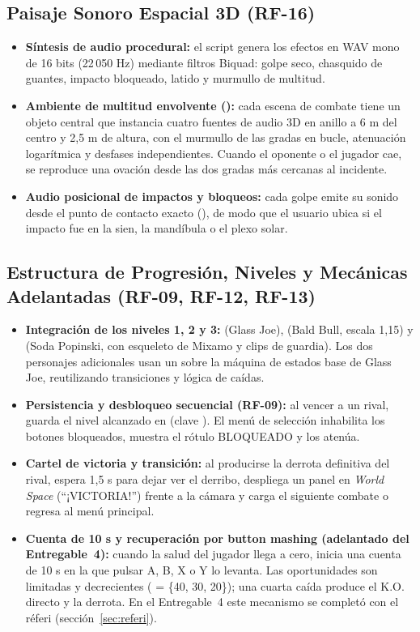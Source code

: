 \subsection{Paisaje Sonoro Espacial 3D (RF-16)}
\begin{itemize}
  \item \textbf{Síntesis de audio procedural:} el script  genera los efectos en WAV mono de 16 bits (22\,050 Hz) mediante filtros Biquad: golpe seco, chasquido de guantes, impacto bloqueado, latido y murmullo de multitud.
  \item \textbf{Ambiente de multitud envolvente ():} cada escena de combate tiene un objeto central que instancia cuatro fuentes de audio 3D en anillo a 6 m del centro y 2,5 m de altura, con el murmullo de las gradas en bucle, atenuación logarítmica y desfases independientes. Cuando el oponente o el jugador cae, se reproduce una ovación desde las dos gradas más cercanas al incidente.
  \item \textbf{Audio posicional de impactos y bloqueos:} cada golpe emite su sonido desde el punto de contacto exacto (), de modo que el usuario ubica si el impacto fue en la sien, la mandíbula o el plexo solar.
\end{itemize}

\subsection{Estructura de Progresión, Niveles y Mecánicas Adelantadas (RF-09, RF-12, RF-13)}
\begin{itemize}
  \item \textbf{Integración de los niveles 1, 2 y 3:}  (Glass Joe),  (Bald Bull, escala 1,15) y  (Soda Popinski, con esqueleto de Mixamo y clips de guardia). Los dos personajes adicionales usan un  sobre la máquina de estados base de Glass Joe, reutilizando transiciones y lógica de caídas.
  \item \textbf{Persistencia y desbloqueo secuencial (RF-09):} al vencer a un rival,  guarda el nivel alcanzado en  (clave ). El menú de selección inhabilita los botones bloqueados, muestra el rótulo BLOQUEADO y los atenúa.
  \item \textbf{Cartel de victoria y transición:} al producirse la derrota definitiva del rival,  espera 1,5 s para dejar ver el derribo, despliega un panel en \emph{World Space} (``¡VICTORIA!'') frente a la cámara y carga el siguiente combate o regresa al menú principal.
  \item \textbf{Cuenta de 10 s y recuperación por button mashing (adelantado del Entregable~4):} cuando la salud del jugador llega a cero,  inicia una cuenta de 10 s en la que pulsar A, B, X o Y lo levanta. Las oportunidades son limitadas y decrecientes ( = \{40, 30, 20\}); una cuarta caída produce el K.O. directo y la derrota. En el Entregable~4 este mecanismo se completó con el réferi (sección~\ref{sec:referi}).
\end{itemize}

